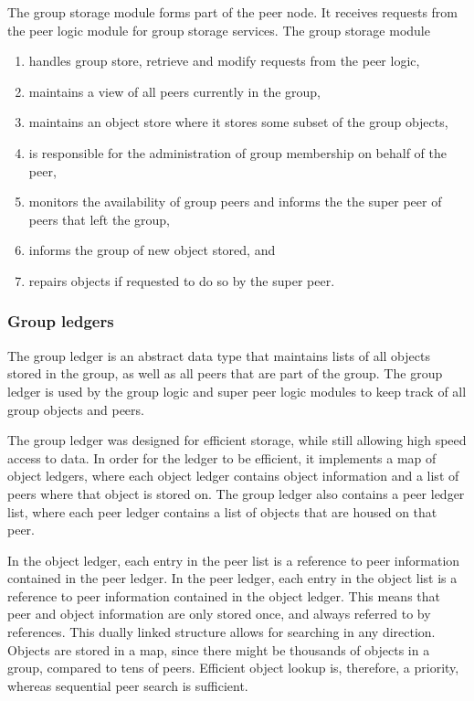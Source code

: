 The group storage module forms part of the peer node. It receives requests from the peer logic module for group storage services. The group storage module
\begin{enumerate}
  \item handles group store, retrieve and modify requests from the peer logic,
  \item maintains a view of all peers currently in the group,
  \item maintains an object store where it stores some subset of the group objects,
  \item is responsible for the administration of group membership on behalf of the peer,
  \item monitors the availability of group peers and informs the the super peer of peers that left the group,
  \item informs the group of new object stored, and
  \item repairs objects if requested to do so by the super peer.
\end{enumerate}

\subsubsection{Group ledgers}
\label{pithos_module_types_ledgers}

The group ledger is an abstract data type that maintains lists of all objects stored in the group, as well as all peers that are part of the group. The group ledger is used by the group logic and super peer logic modules to keep track of all group objects and peers.

The group ledger was designed for efficient storage, while still allowing high speed access to data. In order for the ledger to be efficient, it implements a map of object ledgers, where each object ledger contains object information and a list of peers where that object is stored on. The group ledger also contains a peer ledger list, where each peer ledger contains a list of objects that are housed on that peer.

In the object ledger, each entry in the peer list is a reference to peer information contained in the peer ledger. In the peer ledger, each entry in the object list is a reference to peer information contained in the object ledger. This means that peer and object information are only stored once, and always referred to by references. This dually linked structure allows for searching in any direction. Objects are stored in a map, since there might be thousands of objects in a group, compared to tens of peers. Efficient object lookup is, therefore, a priority, whereas sequential peer search is sufficient.

